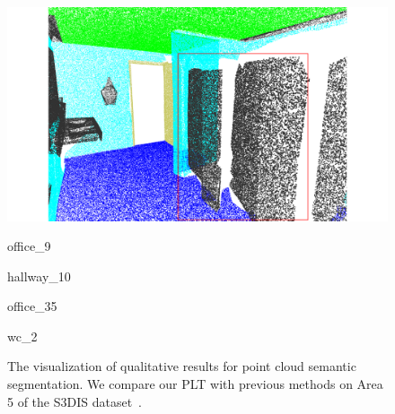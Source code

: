 \begin{figure}[htbp]
\begin{minipage}{0.22\textwidth}
    \end{minipage}
    \hfill
    \begin{minipage}{0.22\textwidth}
        \centering
        \includegraphics[width=\textwidth]{fig/supplement/semantic_segmentation/wc_2/GT_wc_2.pdf}
    \end{minipage}
    \hfill
    
    \vspace{0.5em}
    \begin{minipage}{0.09\textwidth} %
        \color{white}{12}
    \end{minipage}
    \hfill
    \begin{minipage}{0.22\textwidth} %
        \centering
        office\_9
    \end{minipage}
    \hfill
    \begin{minipage}{0.22\textwidth} %
        \centering
        hallway\_10
    \end{minipage}
    \hfill
    \begin{minipage}{0.22\textwidth} %
        \centering
        office\_35
    \end{minipage}
    \hfill
    \begin{minipage}{0.22\textwidth} %
        \centering
        wc\_2
    \end{minipage}
    \hfill
    \caption{The visualization of qualitative results for point cloud semantic segmentation. We compare our PLT with previous methods on Area 5 of the S3DIS dataset~\cite{armeni20163d}.}
    \label{fig:s3dis_1}

\end{figure}
